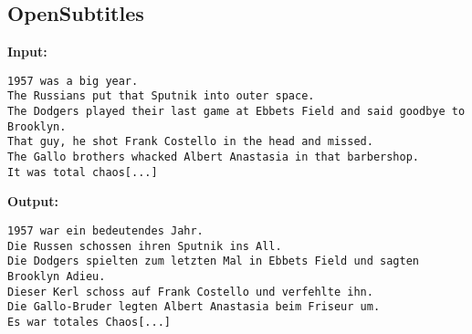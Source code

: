 \documentclass[10pt, a4paper]{article}
\begin{document}
\subsection*{OpenSubtitles}
\textbf{Input:}
\begin{lstlisting}
1957 was a big year.
The Russians put that Sputnik into outer space.
The Dodgers played their last game at Ebbets Field and said goodbye to Brooklyn.
That guy, he shot Frank Costello in the head and missed.
The Gallo brothers whacked Albert Anastasia in that barbershop.
It was total chaos[...]
\end{lstlisting}
\textbf{Output:}
\begin{lstlisting}
1957 war ein bedeutendes Jahr.
Die Russen schossen ihren Sputnik ins All.
Die Dodgers spielten zum letzten Mal in Ebbets Field und sagten Brooklyn Adieu.
Dieser Kerl schoss auf Frank Costello und verfehlte ihn.
Die Gallo-Bruder legten Albert Anastasia beim Friseur um.
Es war totales Chaos[...]
\end{lstlisting}
\end{document}
